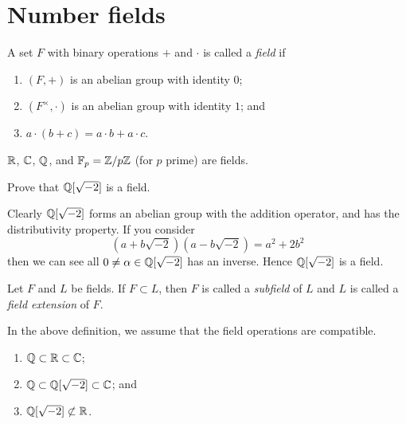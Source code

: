 
\section{Number fields}

\begin{definition}[Field]
	A set $F$ with binary operations $+$ and $\cdot$ is called a \emph{field}
	if
	\begin{enumerate}
		\item $(F, +)$ is an abelian group with identity $0$;
		\item $(F^\times, \cdot)$ is an abelian group with identity $1$; and
		\item $a \cdot (b + c) = a \cdot b + a \cdot c$.
	\end{enumerate}
\end{definition}

\begin{example}[Fields]
	$\mathbb{R}$, $\mathbb{C}$, $\mathbb{Q}$, and $\mathbb{F}_p = \mathbb{Z}/p\mathbb{Z}$ (for $p$ prime) are fields.
\end{example}

\begin{problem}
	Prove that $\mathbb{Q}[\sqrt{-2}]$ is a field.
\end{problem}

\begin{solution}
	Clearly $\mathbb{Q}[\sqrt{-2}]$ forms an abelian group with the addition operator,
	and has the distributivity property.
	If you consider \[
		(a + b\sqrt{-2})(a - b\sqrt{-2}) = a^2 + 2b^2
	\]
	then we can see all $0 \neq \alpha \in \mathbb{Q}[\sqrt{-2}]$ has an inverse.
	Hence $\mathbb{Q}[\sqrt{-2}]$ is a field.
\end{solution}

\begin{definition}[]
	Let $F$ and $L$ be fields.
	If $F \subset L$, then $F$ is called a \emph{subfield} of $L$
	and $L$ is called a \emph{field extension} of $F$.
\end{definition}

In the above definition, we assume that the field operations are compatible.

\begin{examples}[Subfields]
	\begin{enumerate}
		\item $\mathbb{Q} \subset \mathbb{R} \subset \mathbb{C}$;
		\item $\mathbb{Q} \subset \mathbb{Q}[\sqrt{-2}] \subset \mathbb{C}$; and
		\item $\mathbb{Q}[\sqrt{-2}] \not\subset \mathbb{R}$.
	\end{enumerate}	
\end{examples}

